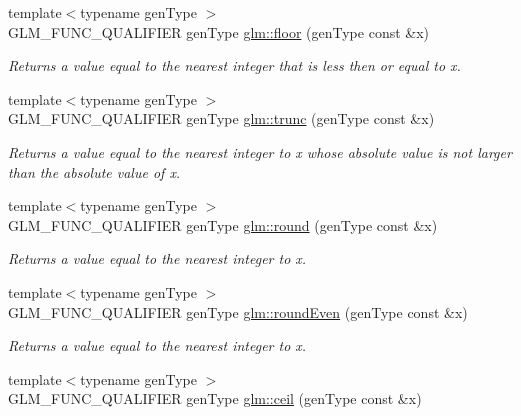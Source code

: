 \begin{DoxyCompactItemize}
\item 
{\footnotesize template$<$typename gen\-Type $>$ }\\G\-L\-M\-\_\-\-F\-U\-N\-C\-\_\-\-Q\-U\-A\-L\-I\-F\-I\-E\-R gen\-Type \hyperlink{group__core__func__common_gac3458e950a8a716468866f841a833c77}{glm\-::floor} (gen\-Type const \&x)
\begin{DoxyCompactList}\small\item\em Returns a value equal to the nearest integer that is less then or equal to x. \end{DoxyCompactList}\item 
{\footnotesize template$<$typename gen\-Type $>$ }\\G\-L\-M\-\_\-\-F\-U\-N\-C\-\_\-\-Q\-U\-A\-L\-I\-F\-I\-E\-R gen\-Type \hyperlink{group__core__func__common_gae1268fe85d913d9e4054de0e046abaef}{glm\-::trunc} (gen\-Type const \&x)
\begin{DoxyCompactList}\small\item\em Returns a value equal to the nearest integer to x whose absolute value is not larger than the absolute value of x. \end{DoxyCompactList}\item 
{\footnotesize template$<$typename gen\-Type $>$ }\\G\-L\-M\-\_\-\-F\-U\-N\-C\-\_\-\-Q\-U\-A\-L\-I\-F\-I\-E\-R gen\-Type \hyperlink{group__core__func__common_ga32125c5451799e80b886ef665b947d0c}{glm\-::round} (gen\-Type const \&x)
\begin{DoxyCompactList}\small\item\em Returns a value equal to the nearest integer to x. \end{DoxyCompactList}\item 
{\footnotesize template$<$typename gen\-Type $>$ }\\G\-L\-M\-\_\-\-F\-U\-N\-C\-\_\-\-Q\-U\-A\-L\-I\-F\-I\-E\-R gen\-Type \hyperlink{group__core__func__common_gab46fe1ce5fdd08f904be811a53364968}{glm\-::round\-Even} (gen\-Type const \&x)
\begin{DoxyCompactList}\small\item\em Returns a value equal to the nearest integer to x. \end{DoxyCompactList}\item 
{\footnotesize template$<$typename gen\-Type $>$ }\\G\-L\-M\-\_\-\-F\-U\-N\-C\-\_\-\-Q\-U\-A\-L\-I\-F\-I\-E\-R gen\-Type \hyperlink{group__core__func__common_ga1ce130f2934cf1d7aca83a7027422f3c}{glm\-::ceil} (gen\-Type const \&x)

\end{DoxyCompactItemize}
